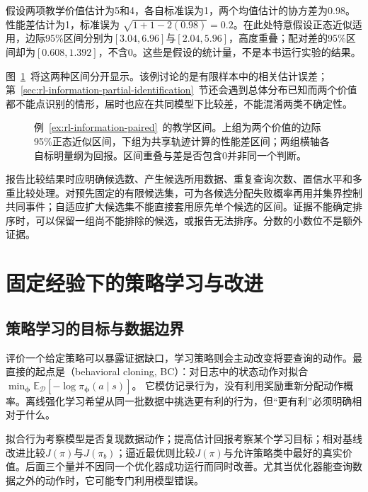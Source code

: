 \begin{example}[价值区间重叠仍可比较性能差]
  \label{ex:rl-information-paired}
  假设两项教学价值估计为5和4，各自标准误为1，两个均值估计的协方差为0.98。性能差估计为1，标准误为
  $\sqrt{1+1-2(0.98)}=0.2$。在此处特意假设正态近似适用，边际95\%区间分别为$[3.04,6.96]$与$[2.04,5.96]$，高度重叠；配对差的95\%区间却为$[0.608,1.392]$，不含0。这些是假设的统计量，不是本书运行实验的结果。
\end{example}

图~\ref{fig:rl-information-comparison}~将这两种区间分开显示。该例讨论的是有限样本中的相关估计误差；第~\ref{sec:rl-information-partial-identification}~节还会遇到总体分布已知而两个价值都不能点识别的情形，届时也应在共同模型下比较差，不能混淆两类不确定性。

\begin{figure}[htbp]
  \centering
  
  \caption{例~\ref{ex:rl-information-paired}~的教学区间。上组为两个价值的边际95\%正态近似区间，下组为共享轨迹计算的性能差区间；两组横轴各自标明量纲为回报。区间重叠与差是否包含0并非同一个判断。}
  \label{fig:rl-information-comparison}
\end{figure}

报告比较结果时应明确候选数、产生候选所用数据、重复查询次数、置信水平和多重比较处理。对预先固定的有限候选集，可为各候选分配失败概率再用并集界控制共同事件；自适应扩大候选集不能直接套用原先单个候选的区间。证据不能确定排序时，可以保留一组尚不能排除的候选，或报告无法排序。分数的小数位不是额外证据。

\section{固定经验下的策略学习与改进}
\label{sec:rl-information-offline-learning}

\subsection{策略学习的目标与数据边界}
\label{sec:rl-information-learning-boundary}

评价一个给定策略可以暴露证据缺口，学习策略则会主动改变将要查询的动作。最直接的起点是（behavioral cloning, BC）：对日志中的状态动作对拟合
$\min_{\bm\phi}\mathbb E_{\mathcal D}[-\log\pi_{\bm\phi}(a\mid s)]$。
它模仿记录行为，没有利用奖励重新分配动作概率。离线强化学习希望从同一批数据中挑选更有利的行为，但“更有利”必须明确相对于什么。

拟合行为考察模型是否复现数据动作；提高估计回报考察某个学习目标；相对基线改进比较$J(\pi)$与$J(\pi_b)$；逼近最优则比较$J(\pi)$与允许策略类中最好的真实价值。后面三个量并不因同一个优化器成功运行而同时改善。尤其当优化器能查询数据之外的动作时，它可能专门利用模型错误。

